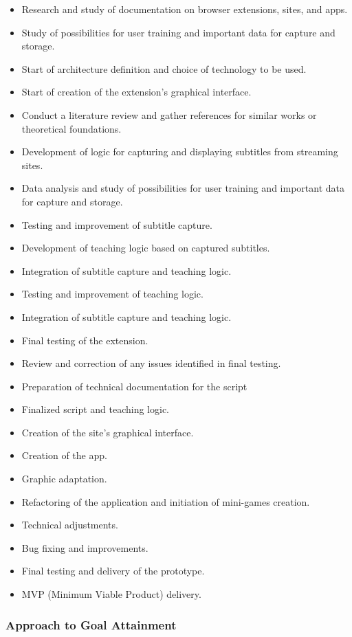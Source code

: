 \documentclass[12pt]{article}
\begin{document}
\begin{itemize}
\item Research and study of documentation on browser extensions, sites, and apps.
\item Study of possibilities for user training and important data for capture and storage.
\item Start of architecture definition and choice of technology to be used.
\item Start of creation of the extension's graphical interface.
\item Conduct a literature review and gather references for similar works or theoretical foundations.
\item Development of logic for capturing and displaying subtitles from streaming sites.
\item Data analysis and study of possibilities for user training and important data for capture and storage.
\item Testing and improvement of subtitle capture.
\item Development of teaching logic based on captured subtitles.
\item Integration of subtitle capture and teaching logic.
\item Testing and improvement of teaching logic.
\item Integration of subtitle capture and teaching logic.
\item Final testing of the extension.
\item Review and correction of any issues identified in final testing.
\item Preparation of technical documentation for the script 
\item Finalized script and teaching logic.
\item Creation of the site's graphical interface.
\item Creation of the app. 
\item Graphic adaptation.
\item Refactoring of the application and initiation of mini-games creation.
\item Technical adjustments.
\item Bug fixing and improvements.
\item Final testing and delivery of the prototype.
\item MVP (Minimum Viable Product) delivery.
\end {itemize}

\subsubsection{Approach to Goal Attainment}
\end{document}
